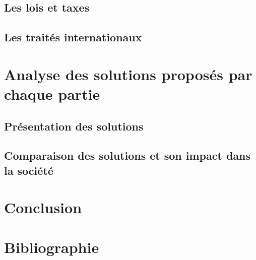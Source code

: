 \documentclass[a4paper,11pt]{article}
\begin{document}
\subsection{Les lois et taxes}
\subsection{Les traités internationaux}


\section{Analyse des solutions proposés par chaque partie}
\subsection{Présentation des solutions}
\subsection{Comparaison des solutions et son impact dans la société}


\section*{Conclusion}
\section*{Bibliographie}
\end{document}
